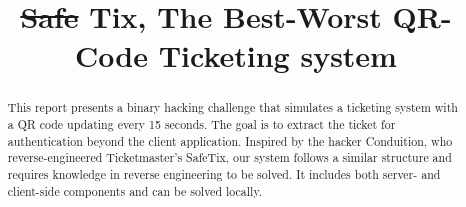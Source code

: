 \documentclass[conference,dvipsnames]{IEEEtran}
\newcommand{\soutthick}[1]{%
    \renewcommand{\ULthickness}{3pt}%
       \sout{#1}%
    \renewcommand{\ULthickness}{.3pt}%
}
\begin{document}
\title{\soutthick{Safe}Tix, The Best-Worst QR-Code Ticketing system}

\author{
}

\maketitle

\begin{abstract}
  This report presents a binary hacking challenge that simulates a ticketing system with a QR code updating 
  every 15 seconds. The goal is to extract the ticket for authentication beyond the client application. 
  Inspired by the hacker Conduition, who reverse-engineered Ticketmaster’s SafeTix, our system follows a 
  similar structure and requires knowledge in reverse engineering to be solved. 
  It includes both server- and client-side components 
  and can be solved locally.
\end{abstract}










\clearpage
%
\end{document}
